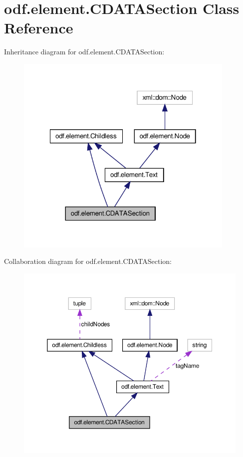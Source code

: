 \hypertarget{classodf_1_1element_1_1CDATASection}{\section{odf.\+element.\+C\+D\+A\+T\+A\+Section Class Reference}
\label{classodf_1_1element_1_1CDATASection}
}


Inheritance diagram for odf.\+element.\+C\+D\+A\+T\+A\+Section\+:
\nopagebreak
\begin{figure}[H]
\begin{center}
\leavevmode
\includegraphics[width=298pt]{classodf_1_1element_1_1CDATASection__inherit__graph}
\end{center}
\end{figure}


Collaboration diagram for odf.\+element.\+C\+D\+A\+T\+A\+Section\+:
\nopagebreak
\begin{figure}[H]
\begin{center}
\leavevmode
\includegraphics[width=350pt]{classodf_1_1element_1_1CDATASection__coll__graph}
\end{center}
\end{figure}
